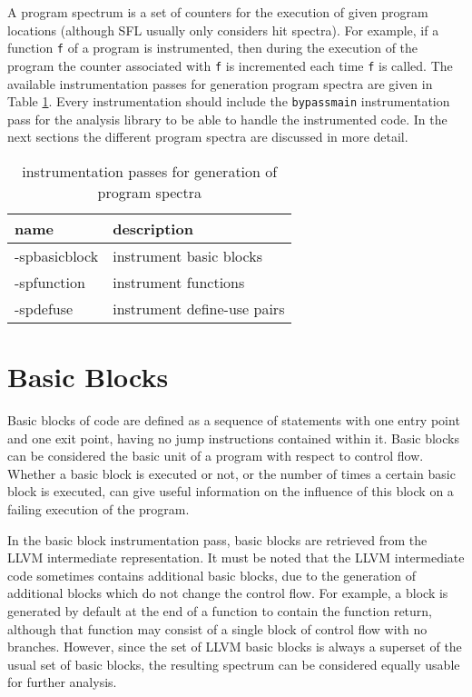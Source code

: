 

A program spectrum is a set of counters for the execution of given program locations
(although SFL usually only considers hit spectra).
For example, if a function \verb|f| of a program is instrumented,
then during the execution of the program the counter associated with \verb|f| is incremented each time \verb|f| is called.
The available instrumentation passes for generation program spectra are given in Table \ref{t:programspectra}.
Every instrumentation should include the \verb|bypassmain| instrumentation pass 
for the analysis library to be able to handle the instrumented code.
In the next sections the different program spectra are discussed in more detail.


\begin{table}
  \begin{center}
  \begin{tabular}{l|l}
    name & description \\
	\hline
    -spbasicblock & instrument basic blocks \\
	-spfunction & instrument functions \\
	-spdefuse & instrument define-use pairs \\
  \end{tabular}
  \caption{instrumentation passes for generation of program spectra}
  \label{t:programspectra}
  \end{center}
\end{table}



\section{Basic Blocks}

	Basic blocks of code are defined as a sequence of statements with one entry point and one exit point,
	having no jump instructions contained within it.
	Basic blocks can be considered the basic unit of a program with respect to control flow.
	Whether a basic block is executed or not, or the number of times a certain basic block is executed, 
	can give useful information on the influence of this block on a failing execution of the program.
	
	In the basic block instrumentation pass, basic blocks are retrieved from the LLVM intermediate representation.
	It must be noted that the LLVM intermediate code sometimes contains additional basic blocks, 
	due to the generation of additional blocks which do not change the control flow.
	For example, a block is generated by default at the end of a function to contain the function return,
	although that function may consist of a single block of control flow with no branches.
	However, since the set of LLVM basic blocks is always a superset of the usual set of basic blocks,
	the resulting spectrum can be considered equally usable for further analysis.

